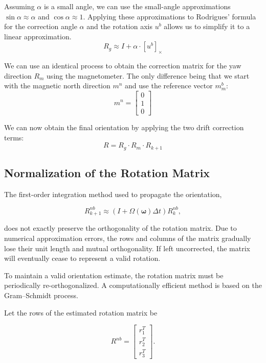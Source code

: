 \documentclass{article}
\begin{document}
\noindent Assuming $\alpha$ is a small angle, we can use the small-angle approximations $\sin\alpha \approx \alpha$ and $\cos\alpha \approx 1$. Applying these approximations to Rodrigues' formula for the correction angle $\alpha$ and the rotation axis $u^b$ allows us to simplify it to a linear approximation.
\[
R_g \approx I + \alpha \cdot [u^b]_\times
\]

\noindent We can use an identical process to obtain the correction matrix for the yaw direction $R_m$ using the magnetometer. The only difference being that we start with the magnetic north direction $m^n$ and use the reference vector $m^b_m$:
\[
m^n = 
\begin{bmatrix}
	0 \\
	1 \\
	0
\end{bmatrix}
\]

\noindent We can now obtain the final orientation by applying the two drift correction terms:
\[
	R = R_g \cdot R_m \cdot R_{k+1} 
\]

\subsection{Normalization of the Rotation Matrix}

The first-order integration method used to propagate the orientation,

\[
R_{k+1}^{nb} \approx \left(I + \Omega(\boldsymbol{\omega})\Delta t\right)R_k^{nb},
\]

does not exactly preserve the orthogonality of the rotation matrix. Due to numerical approximation errors, the rows and columns of the matrix gradually lose their unit length and mutual orthogonality. If left uncorrected, the matrix will eventually cease to represent a valid rotation.

\vspace{1em}
\noindent To maintain a valid orientation estimate, the rotation matrix must be periodically re-orthogonalized. A computationally efficient method is based on the Gram--Schmidt process.

\vspace{1em}
\noindent Let the rows of the estimated rotation matrix be

\[
R^{nb} =
\begin{bmatrix}
	r_1^T \\
	r_2^T \\
	r_3^T
\end{bmatrix}.
\]
\end{document}
